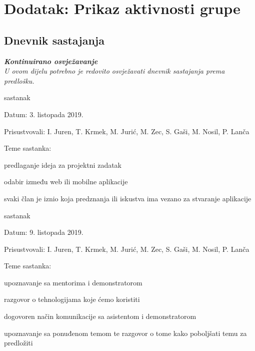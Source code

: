 \chapter*{Dodatak: Prikaz aktivnosti grupe}
		
		\section*{Dnevnik sastajanja}
		
		\textbf{\textit{Kontinuirano osvježavanje}}\\
		
		 \textit{U ovom dijelu potrebno je redovito osvježavati dnevnik sastajanja prema predlošku.}
		
		\begin{packed_enum}
			\item  sastanak
			
			\item[] \begin{packed_item}
				\item Datum: 3. listopada 2019.
				\item Prisustvovali: I. Juren, T. Krmek, M. Jurić, M. Zec, S. Gaši, M. Nosil, P. Lanča
				\item Teme sastanka:
				\begin{packed_item}
					\item  predlaganje ideja za projektni zadatak
					\item  odabir između web ili mobilne aplikacije
					\item  svaki član je iznio koja predznanja ili iskustva ima vezano za stvaranje aplikacije  
				\end{packed_item}
			\end{packed_item}
			
			\item  sastanak
			\item[] \begin{packed_item}
				\item Datum: 9. listopada 2019.
				\item Prisustvovali: I. Juren, T. Krmek, M. Jurić, M. Zec, S. Gaši, M. Nosil, P. Lanča
				\item Teme sastanka:
				\begin{packed_item}
					\item  upoznavanje sa mentorima i demonstratorom
					\item  razgovor o tehnologijama koje ćemo koristiti
					\item  dogovoren način komunikacije sa asistentom i demonstratorom
					\item  upoznavanje sa ponuđenom temom te razgovor o tome kako poboljšati temu za predložiti
				\end{packed_item}
			\end{packed_item}
			

\end{packed_enum}

